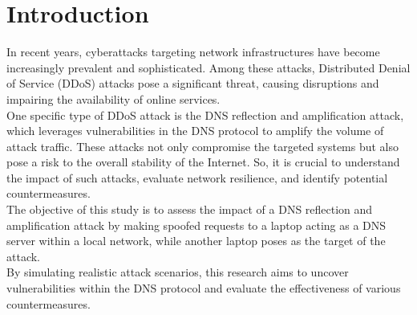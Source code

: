 \section{Introduction}
	In recent years, cyberattacks targeting network infrastructures have become increasingly prevalent and sophisticated.
	Among these attacks, Distributed Denial of Service (DDoS) attacks pose a significant threat, causing disruptions and impairing the availability of online services.\\
	One specific type of DDoS attack is the DNS reflection and amplification attack, which leverages vulnerabilities in the DNS protocol
	to amplify the volume of attack traffic.
	These attacks not only compromise the targeted systems but also pose a risk to the overall stability of the Internet.
	So, it is crucial to understand the impact of such attacks, evaluate network resilience, and identify potential countermeasures.\\
	The objective of this study is to assess the impact of a DNS reflection and amplification attack by making spoofed requests to a laptop acting as a DNS server within a local network, while another laptop poses as the target of the attack.\\ 
    By simulating realistic attack scenarios, this research aims to uncover vulnerabilities within the DNS protocol and evaluate the effectiveness 
    of various countermeasures.